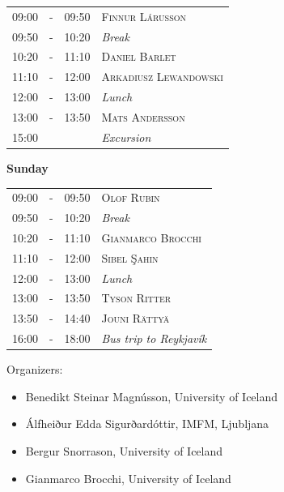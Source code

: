 \documentclass[12pt, openany, twoside]{report}      %
\begin{document}
\noindent
\begin{tabular}{l@{ } l@{ } l l}
09:00 & - & 09:50 & \textsc{Finnur Lárusson}
\\
09:50 & - & 10:20 & \textit{Break}
\\
10:20 & - & 11:10 & \textsc{Daniel Barlet}
\\
11:10 & - & 12:00 & \textsc{Arkadiusz Lewandowski}
\\
12:00 & - & 13:00 & \textit{Lunch}
\\
13:00 & - & 13:50 & \textsc{Mats Andersson}
\\
15:00 &  &  & \textit{Excursion}
\end{tabular}

\bigskip
\noindent
\textbf{\large Sunday}
\smallskip

\noindent
\begin{tabular}{l@{ } l@{ } l l}
09:00 & - & 09:50 & \textsc{Olof Rubin}
\\
09:50 & - & 10:20 & \textit{Break}
\\
10:20 & - & 11:10 & \textsc{Gianmarco Brocchi}
\\
11:10 & - & 12:00 & \textsc{Sibel Şahin}
\\
12:00 & - & 13:00 & \textit{Lunch}
\\
13:00 & - & 13:50 & \textsc{Tyson Ritter}
\\
13:50 & - & 14:40 & \textsc{Jouni Rättyä}
\\
16:00 & - & 18:00 & \textit{Bus trip to Reykjavík}
\end{tabular}

\vfill
\vfill
\noindent
Organizers:
\begin{itemize}
    \setlength\itemsep{-0.3 em}
    \item Benedikt Steinar Magnússon, University of Iceland
    \item Álfheiður Edda Sigurðardóttir, IMFM, Ljubljana
    \item Bergur Snorrason, University of Iceland
    \item Gianmarco Brocchi, University of Iceland
\end{itemize}
\vfill

\cleardoublepage

\newcommand\talk[3]{%
    \vspace{3 ex}
    \noindent
    \textsc{\large #1}

    \smallskip
    \noindent
    \textbf{\textit{#2}}

    \medskip
    \noindent
    #3

}
\end{document}
